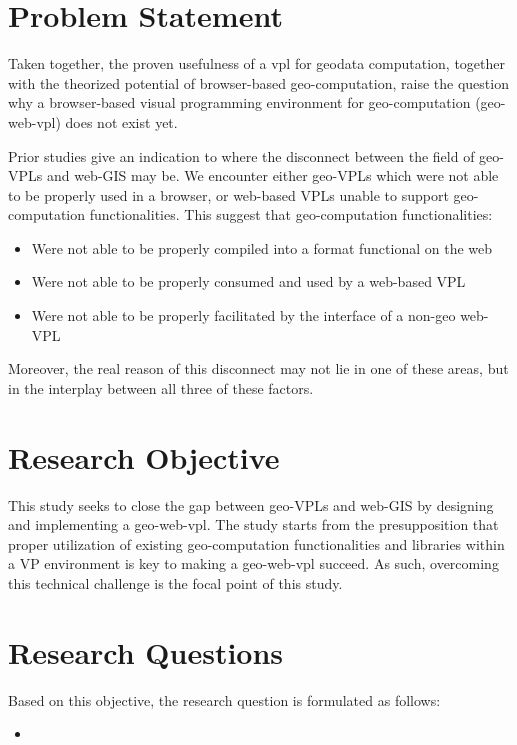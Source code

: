 


\section{Problem Statement}
Taken together, the proven usefulness of a vpl for geodata computation, together with the theorized potential of browser-based geo-computation, raise the question why a browser-based visual programming environment for geo-computation (geo-web-vpl) does not exist yet.

Prior studies give an indication to where the disconnect between the field of geo-VPLs and web-GIS may be.  
We encounter either geo-VPLs which were not able to be properly used in a browser, or web-based VPLs unable to support geo-computation functionalities.
This suggest that geo-computation functionalities:
\begin{itemize}[-]
  \item Were not able to be properly compiled into a format functional on the web
  \item Were not able to be properly consumed and used by a web-based VPL
  \item Were not able to be properly facilitated by the interface of a non-geo web-VPL
\end{itemize}

Moreover, the real reason of this disconnect may not lie in one of these areas, but in the interplay between all three of these factors. 

\newpage
\section{Research Objective}
This study seeks to close the gap between geo-VPLs and web-GIS by designing and implementing a geo-web-vpl.
The study starts from the presupposition that proper utilization of existing geo-computation functionalities and libraries within a VP environment is key to making a geo-web-vpl succeed. 
As such, overcoming this technical challenge is the focal point of this study. 

\section{Research Questions}
Based on this objective, the research question is formulated as follows: 
\begin{itemize}[ ]
  \item \myMainRQ
\end{itemize}

